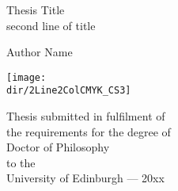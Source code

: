 \thispagestyle{empty}

\begin{minipage}{\textwidth}
\end{minipage}
\begin{center}
\vspace{2cm}
{ \Huge Thesis Title \\second line of title
  \par
  \vspace{0.5cm} 
{\Large Author Name \par}
}
\vfill
\centerline{\texttt{[image: \\dir/2Line2ColCMYK\_CS3]}}
\vspace{0.5cm}
Thesis submitted in fulfilment of\\
the requirements for the degree of\\ 
Doctor of Philosophy\\ 
to the\\
University of Edinburgh --- 20xx
\end{center}

\newpage
\thispagestyle{empty}


